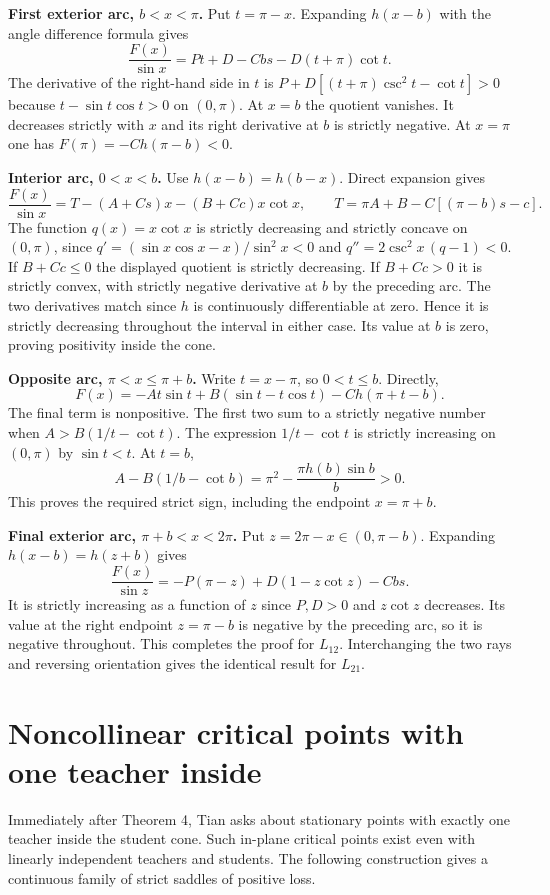 \documentclass[11pt]{article}
\begin{document}
\textbf{First exterior arc, $b<x<\pi$.} Put $t=\pi-x$. Expanding $h(x-b)$ with the angle difference formula gives
\[
 \frac{F(x)}{\sin x}=Pt+D-Cbs-D(t+\pi)\cot t .
\]
The derivative of the right-hand side in $t$ is $P+D[(t+\pi)\csc^2t-\cot t]>0$ because $t-\sin t\cos t>0$ on $(0,\pi)$. At $x=b$ the quotient vanishes. It decreases strictly with $x$ and its right derivative at $b$ is strictly negative. At $x=\pi$ one has $F(\pi)=-Ch(\pi-b)<0$.

\textbf{Interior arc, $0<x<b$.} Use $h(x-b)=h(b-x)$. Direct expansion gives
\[
 \frac{F(x)}{\sin x}
 =T-(A+Cs)x-(B+Cc)x\cot x,\qquad
 T=\pi A+B-C[(\pi-b)s-c].
\]
The function $q(x)=x\cot x$ is strictly decreasing and strictly concave on $(0,\pi)$, since $q'=(\sin x\cos x-x)/\sin^2x<0$ and $q''=2\csc^2 x\,(q-1)<0$. If $B+Cc\leq0$ the displayed quotient is strictly decreasing. If $B+Cc>0$ it is strictly convex, with strictly negative derivative at $b$ by the preceding arc. The two derivatives match since $h$ is continuously differentiable at zero. Hence it is strictly decreasing throughout the interval in either case. Its value at $b$ is zero, proving positivity inside the cone.

\textbf{Opposite arc, $\pi<x\leq\pi+b$.} Write $t=x-\pi$, so $0<t\leq b$. Directly,
\[
 F(x)=-At\sin t+B(\sin t-t\cos t)-Ch(\pi+t-b).
\]
The final term is nonpositive. The first two sum to a strictly negative number when $A>B(1/t-\cot t)$. The expression $1/t-\cot t$ is strictly increasing on $(0,\pi)$ by $\sin t<t$. At $t=b$,
\[
 A-B(1/b-\cot b)
 =\pi^2-\frac{\pi h(b)\sin b}{b}>0 .
\]
This proves the required strict sign, including the endpoint $x=\pi+b$.

\textbf{Final exterior arc, $\pi+b<x<2\pi$.} Put $z=2\pi-x\in(0,\pi-b)$. Expanding $h(x-b)=h(z+b)$ gives
\[
 \frac{F(x)}{\sin z}=-P(\pi-z)+D(1-z\cot z)-Cbs.
\]
It is strictly increasing as a function of $z$ since $P,D>0$ and $z\cot z$ decreases. Its value at the right endpoint $z=\pi-b$ is negative by the preceding arc, so it is negative throughout. This completes the proof for $L_{12}$. Interchanging the two rays and reversing orientation gives the identical result for $L_{21}$.

\section*{Noncollinear critical points with one teacher inside}
Immediately after Theorem 4, Tian asks about stationary points with exactly one teacher inside the student cone. Such in-plane critical points exist even with linearly independent teachers and students. The following construction gives a continuous family of strict saddles of positive loss.
\end{document}
